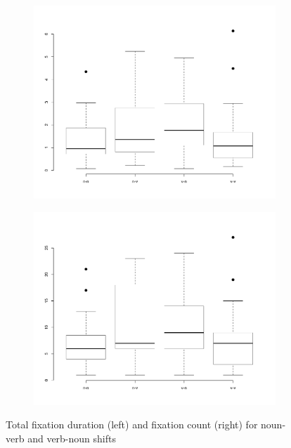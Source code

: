 \documentclass[output=paper]{LSP/langsci}
\begin{document}
\begin{figure}[t]
	\begin{subfigure}{.47\textwidth}
  	\centering
  	\includegraphics[width=\linewidth]{figures/serbinaetal/serbinaetal4.pdf}
	\end{subfigure}
    \begin{subfigure}{.47\textwidth}
  	\centering
  	\includegraphics[width=\linewidth]{figures/serbinaetal/serbinaetal5.pdf}
	\end{subfigure}
\caption{Total fixation duration (left) and fixation count (right) for noun-verb and verb-noun shifts}
\label{serbinaetal:fig:4}
\end{figure}
\end{document}

